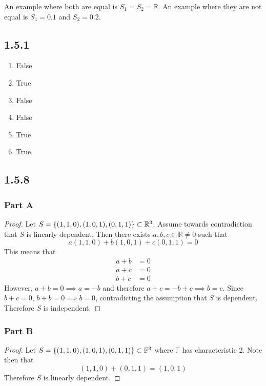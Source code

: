 \documentclass[12pt,titlepage]{extarticle}
\begin{document}
An example where both are equal is $S_1 = S_2 = \mathbb{R}$. An example where they are not equal is $S_1 = \qty{0, 1}$ and $S_2 = \qty{0, 2}$.

\subsection*{1.5.1}
\begin{enumerate}[label=\alph*)]
	\item False
	\item True
	\item False
	\item False
	\item True
	\item True
\end{enumerate}

\subsection*{1.5.8}
\subsubsection*{Part A}
\begin{proof}
	Let $S = \qty{(1,1,0), (1, 0, 1), (0,1,1)} \subset \mathbb{R}^3$. Assume towards contradiction that $S$ is linearly dependent. Then there exists $a,b,c \in \mathbb{R} \neq 0$ such that 
    \[
        a(1,1,0) + b(1,0,1) + c(0,1,1) = 0
    \]
    This means that
    \begin{align*}
        a + b &= 0 \\
        a + c &= 0 \\
        b + c &= 0
    \end{align*}
    However, $a + b = 0 \implies a = -b$ and therefore $a + c = -b + c \implies b = c$. Since $b+c = 0$, $b + b = 0 \implies b = 0$, contradicting the assumption that $S$ is dependent. Therefore $S$ is independent.
\end{proof}

\subsubsection*{Part B}
\begin{proof}
	Let $S = \qty{(1,1,0), (1, 0, 1), (0,1,1)} \subset \mathbb{F}^3$ where $\mathbb{F}$ has characteristic 2. Note then that
    \[
        (1, 1, 0) + (0,1,1) = (1,0,1)
    \]
    Therefore $S$ is linearly dependent.
\end{proof}
\end{document}
